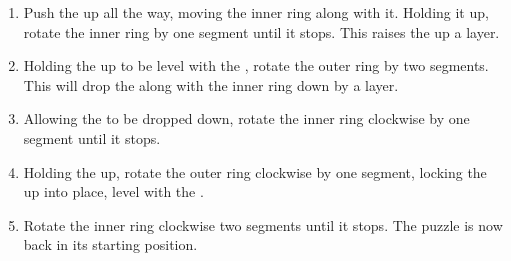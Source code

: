 \documentclass{article}
\begin{document}
\begin{enumerate}
      \item Push the \vhalf{} up all the way, moving the inner ring along with it.
            Holding it up, rotate the inner ring \cc{} by one segment until it stops.
            This raises the \vhalf{} up a layer.
      \item Holding the \vhalf{} up to be level with the \hhalf{}, rotate the outer ring \cc{} by two segments.
            This will drop the \hhalf{} along with the inner ring down by a layer.
      \item Allowing the \hhalf{} to be dropped down, rotate the inner ring clockwise by one segment until it stops.
      \item Holding the \hhalf{} up, rotate the outer ring clockwise by one segment, locking the \hhalf{} up into place, level with the \vhalf{}.
      \item Rotate the inner ring clockwise two segments until it stops.
            The puzzle is now back in its starting position.
\end{enumerate}
\end{document}
